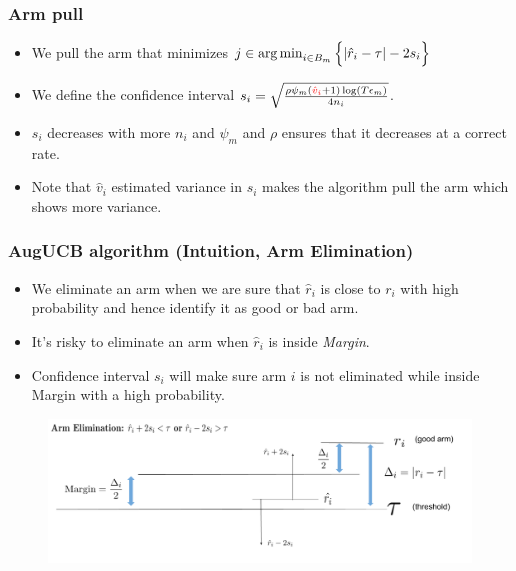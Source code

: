 \begin{frame}
\frametitle{Arm pull}
\begin{itemize}
\item<1-> We pull the arm that minimizes $j\in\operatorname*{arg\,min}_{i\in B_{m}}\Big\lbrace |\hat{r}_{i} - \tau | - 2s_{i}\Big\rbrace$
\item<2-> We define the confidence interval $s_i  = \sqrt{\frac{\rho\psi_m (\mathbin{\textcolor{red}{\hat{v}_{i}}}+1) \log ( T \epsilon_{m})}{4 n_{i}}}$.
\item<3-> $s_i$ decreases with more $n_i$ and $\psi_m$ and $\rho$ ensures that it decreases at a correct rate.
\item<4-> Note that $\hat{v}_i$ estimated variance in $s_i$ makes the algorithm pull the arm which shows more variance. 
\end{itemize}
\end{frame}

\begin{frame}
\frametitle{AugUCB algorithm (Intuition, Arm Elimination)}
\begin{itemize}
\item We eliminate an arm when we are sure that $\hat{r}_i$ is close to $r_i$ with high probability and hence identify it as good or bad arm.
\item It's risky to eliminate an arm when $\hat{r}_i$ is inside \emph{Margin}. 
\item Confidence interval $s_i$ will make sure arm $i$ is not eliminated while inside Margin with a high probability.  
\end{itemize}

\begin{figure}
\includegraphics[scale=0.278]{img/ArmElim_1.png}
\end{figure}
\end{frame}

